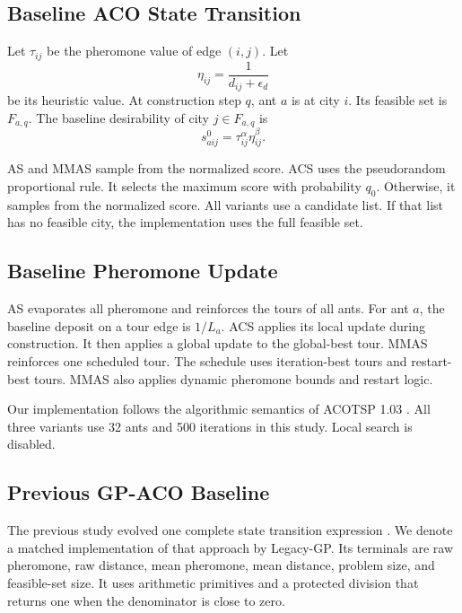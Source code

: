 \documentclass[letterpaper,journal]{IEEEtran}
\begin{document}
\subsection{Baseline ACO State Transition}

Let \(\tau_{ij}\) be the pheromone value of edge \((i,j)\).
Let
\begin{equation}
    \eta_{ij}=\frac{1}{d_{ij}+\epsilon_d}
\end{equation}
be its heuristic value.
At construction step \(q\), ant \(a\) is at city \(i\).
Its feasible set is \(F_{a,q}\).
The baseline desirability of city \(j\in F_{a,q}\) is
\begin{equation}
    s^0_{aij}=\tau_{ij}^{\alpha}\eta_{ij}^{\beta}.
    \label{eq:baseline-score}
\end{equation}

AS and MMAS sample from the normalized score.
ACS uses the pseudorandom proportional rule.
It selects the maximum score with probability \(q_0\).
Otherwise, it samples from the normalized score.
All variants use a candidate list.
If that list has no feasible city, the implementation uses the full feasible set.

\subsection{Baseline Pheromone Update}

AS evaporates all pheromone and reinforces the tours of all ants.
For ant \(a\), the baseline deposit on a tour edge is \(1/L_a\).
ACS applies its local update during construction.
It then applies a global update to the global-best tour.
MMAS reinforces one scheduled tour.
The schedule uses iteration-best tours and restart-best tours.
MMAS also applies dynamic pheromone bounds and restart logic.

Our implementation follows the algorithmic semantics of ACOTSP 1.03 \cite{stutzle2004acotsp}.
All three variants use 32 ants and 500 iterations in this study.
Local search is disabled.

\subsection{Previous GP-ACO Baseline}

The previous study evolved one complete state transition expression \cite{lin2025gpaco}.
We denote a matched implementation of that approach by Legacy-GP.
Its terminals are raw pheromone, raw distance, mean pheromone, mean distance, problem size, and feasible-set size.
It uses arithmetic primitives and a protected division that returns one when the denominator is close to zero.
\end{document}
